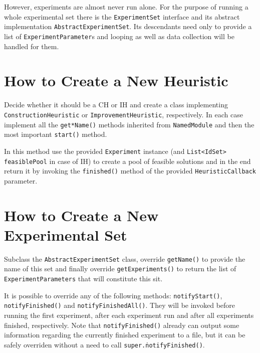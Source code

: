 However, experiments are almost never run alone. For the purpose of running a whole experimental set there is the \texttt{Experiment\-Set} interface and its abstract implementation \texttt{Abstract\-Experiment\-Set}. Its descendants need only to provide a list of \texttt{Experiment\-Parameter}s and looping as well as data collection will be handled for them.

\section{How to Create a New Heuristic}
\label{section-appendix-iss-howto}

Decide whether it should be a CH or IH and create a class implementing \texttt{Con\-struc\-tion\-Heu\-ris\-tic} or \texttt{Im\-prove\-ment\-Heu\-ris\-tic}, respectively. In each case implement all the \texttt{get*Name()} methods inherited from \texttt{Named\-Module} and then the most important \texttt{start()} method.

In this method use the provided \texttt{Experiment} instance (and \texttt{List<IdSet> feasiblePool} in case of IH) to create a pool of feasible solutions and in the end return it by invoking the \texttt{finished()} method of the provided \texttt{Heuristic\-Callback} parameter.

\section{How to Create a New Experimental Set}

Subclass the \texttt{Abstract\-Experiment\-Set} class, override \texttt{get\-Name()} to provide the name of this set and finally override \texttt{get\-Experiments()} to return the list of \texttt{Experiment\-Parameters} that will constitute this sit.

It is possible to override any of the following methods: \texttt{notify\-Start()}, \texttt{notify\-Finished()} and \texttt{notify\-Finished\-All()}. They will be invoked before running the first experiment, after each experiment run and after all experiments finished, respectively. Note that \texttt{notify\-Finished()} already can output some information regarding the currently finished experiment to a file, but it can be safely overriden without a need to call \texttt{super.\.notify\-Finished()}.